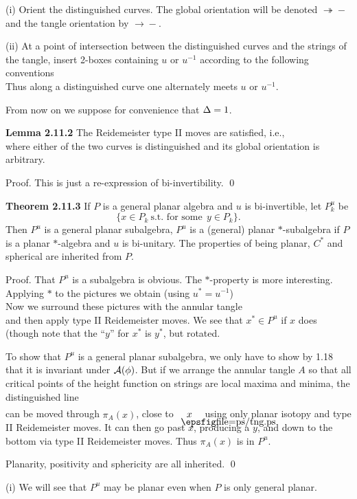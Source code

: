 \medskip (i) Orient the distinguished curves. The global
orientation will be denoted $\twoheadrightarrow\!\!-$ and the tangle
orientation by $\rightarrow\!\!-$.

\smallskip (ii) At a point of intersection between the
distinguished curves and the strings of the tangle, insert 2-boxes
containing $u$ or $u^{-1}$ according to the following conventions
\[
	
\]
\bs
\ni Thus along a distinguished curve one alternately meets $u$ or
$u^{-1}$.

From now on we suppose for convenience that $\Delta = 1$.

\bs\ni
{\bf Lemma 2.11.2} The Reidemeister type  II moves are
satisfied, i.e.,
\[
	
\]
\ni where either of the two curves is distinguished and its global
orientation is arbitrary.

\bs
{\sc Proof.} This is just a re-expression of bi-invertibility. \qed

\bs\ni
{\bf Theorem 2.11.3} If $P$ is a general planar algebra and
$u$ is bi-invertible, let $P^u_k$ be
\bs
\[
\{x\in P_k\ \text{s.t.} 
\mbox{\ \ for some}\ \ y\in  P_k\}.
\]
\bs
Then $P^u$ is a  general planar subalgebra, $P^u$ is a (general)
planar $*$-subalgebra if $P$ is a planar $*$-algebra and $u$ is
bi-unitary. The properties of being planar, $C^*$ and spherical
are inherited from $P$.

\bs
{\sc Proof.} That $P^u$ is a subalgebra is obvious. The
$*$-property is more interesting. Applying $*$ to the pictures we
obtain (using $u^*=u^{-1}$)
\[
	
\]
\ni Now we surround these pictures with the annular tangle
\[
	
\]
\ni and then apply type II Reidemeister moves. We see that $x^*\in
P^u$ if $x$ does (though note that the ``$y$'' for $x^*$ is
$y^*$, but rotated.

To show that $P^u$ is a general planar subalgebra, we only have to
show by 1.18 that it is invariant under $\cal A(\phi)$. But if we
arrange the annular tangle $A$ so that all critical points of the
height function on strings are local maxima and minima, the
distinguished line
\[
	
\]
\ni can be moved through $\pi_A(x)$, close to \ $\tangle{x}$ 
using only planar isotopy and type II Reidemeister moves.
It can then go past $x$, producing a $y$, and down to the bottom
via type II Reidemeister moves. Thus  $\pi_A(x)$ is in $P^u$.

Planarity, positivity and sphericity are all
inherited. \qed

 (i) We will see that $P^u$ may be planar even
when $P$ is only general planar.

